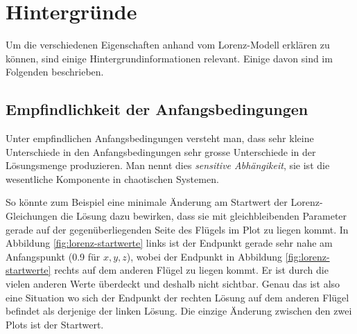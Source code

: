 
\section{Hintergründe}\label{backgroundinfo}
Um die verschiedenen Eigenschaften anhand vom Lorenz-Modell erklären zu können, sind einige Hintergrundinformationen relevant. Einige davon sind im Folgenden beschrieben.

\subsection{Empfindlichkeit der Anfangsbedingungen}
Unter empfindlichen Anfangsbedingungen versteht man, dass sehr kleine Unterschiede in den Anfangsbedingungen sehr grosse Unterschiede in der Lösungsmenge produzieren. Man nennt dies {\em sensitive Abhängikeit}, sie ist die wesentliche Komponente in chaotischen Systemen. 
%

So könnte zum Beispiel eine minimale Änderung am Startwert der Lorenz-Gleichungen die Lösung dazu bewirken, dass sie mit gleichbleibenden Parameter gerade auf der gegenüberliegenden Seite des Flügels im Plot zu liegen kommt. In Abbildung \ref{fig:lorenz-startwerte} links ist der Endpunkt gerade sehr nahe am Anfangspunkt (0.9 für $ x, y, z $), wobei der Endpunkt in Abbildung \ref{fig:lorenz-startwerte} rechts auf dem anderen Flügel zu liegen kommt. Er ist durch die vielen anderen Werte überdeckt und deshalb nicht sichtbar. Genau das ist also eine Situation wo sich der Endpunkt der rechten Lösung auf dem anderen Flügel befindet als derjenige der linken Lösung. Die einzige Änderung zwischen den zwei Plots ist der Startwert.

